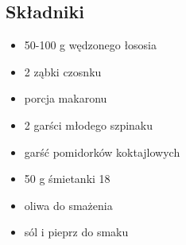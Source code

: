 \documentclass[a4paper,10pt]{book}
\begin{document}
\begin{multicols}{2}

\subsection*{Składniki} \begin{itemize} 
    \item 50-100 g wędzonego łososia 
    \item 2 ząbki czosnku 
    \item porcja makaronu 
    \item 2 garści młodego szpinaku
    \item garść pomidorków koktajlowych
    \item 50 g śmietanki 18%
    \item oliwa do smażenia 
    \item sól i pieprz do smaku
\end{itemize}

\columnbreak

\begin{figure}[H]
    \centering
\end{figure}
\end{multicols}

\vspace{0.5cm} 
\end{document}
